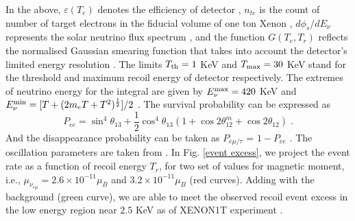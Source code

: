 \documentclass[aps, a4paper,superscriptaddress,12pt,preprintnumbers,floatfix,nofootinbib,amsmath,amssymb]{revtex4}
\def \epsilon {\varepsilon} %
\begin{document}
In the above, $\epsilon(T_e)$ denotes the efficiency of detector \cite{XENON:2020rca}, $n_{te}$ is the count of number of target electrons in the fiducial volume of one ton Xenon \cite{XENON:2020iwh}, $d\phi_s/dE_\nu$ represents the solar neutrino flux spectrum \cite{Bahcall:2004mz}, and the function $G(T_e,T_r)$ reflects the normalised Gaussian smearing function that takes into account the detector's limited energy resolution \cite{XENON:2020rca}. 
The limits $T_{\rm th} = 1$ KeV and $T_{\rm max} =  30$ KeV stand for the threshold and maximum recoil energy of detector respectively. The extremes of neutrino energy for the integral are given by $E^{\rm max}_\nu = 420$ KeV and $E^{\rm min}_\nu = [T+(2m_e T+T^2)^\frac{1}{2}]/2$ \cite{Babu:2020ivd}. The survival probability can be expressed as 
\begin{equation}
    P_{ee} = \sin^4 \theta_{13} + \frac{1}{2} \cos^4 \theta_{13} (1 + \cos 2 \theta^{m}_{12} + \cos 2 \theta_{12})\;.
\end{equation}
And the disappearance probability can be taken as $P_{e \mu /\tau}$ = $1 - P_{ee}$ \cite{Lopes:2013nfa, ParticleDataGroup:2020ssz}. The oscillation parameters are taken from \cite{Esteban:2020cvm}. In Fig. \ref{event excess}, we project the event rate as a function of recoil energy $T_r$, for two set of values for magnetic moment, i.e., $\mu_{\nu_{e\mu}}=2.6\times 10^{-11}\mu_B $  and  $3.2\times 10^{-11}\mu_B $ (red curves). Adding with the background (green curve), we are able to meet the observed recoil event excess in the low energy region near $2.5$ KeV as of XENON1T experiment \cite{XENON:2020rca}.
\end{document}
